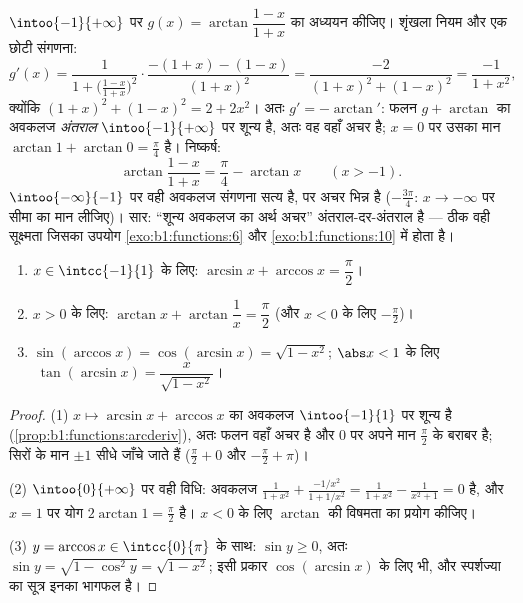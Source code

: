 \begin{example}\label{ex:b1:functions:hiddenconst}
$\intoo{-1} {+\infty}$ पर $g(x) = \arctan\dfrac{1 - x}{1 + x}$ का अध्ययन
कीजिए। शृंखला नियम और एक छोटी संगणना:
\[
g'(x) = \frac{1}{1 + \bigl(\frac{1-x}{1+x}\bigr)^2}\cdot
\frac{-(1+x) - (1-x)}{(1+x)^2}
= \frac{-2}{(1+x)^2 + (1-x)^2}
= \frac{-1}{1 + x^2} ,
\]
क्योंकि $(1+x)^2 + (1-x)^2 = 2 + 2x^2$। अतः $g' = -\arctan'$: फलन $g +
\arctan$ का अवकलज \emph{अंतराल} $\intoo{-1}{+\infty}$ पर शून्य है, अतः वह
वहाँ अचर है; $x = 0$ पर उसका मान $\arctan 1 + \arctan 0 = \frac\pi4$ है।
निष्कर्ष:
\[
\arctan\frac{1 - x}{1 + x} = \frac\pi4 - \arctan x
\qquad (x > -1) .
\]
$\intoo{-\infty}{-1}$ पर वही अवकलज संगणना सत्य है, पर अचर भिन्न है
($-\frac{3\pi}4$: $x \to -\infty$ पर सीमा का मान लीजिए)। सार: ``शून्य अवकलज
का अर्थ अचर'' अंतराल-दर-अंतराल  है --- ठीक वही सूक्ष्मता जिसका उपयोग
\cref{exo:b1:functions:6} और \cref{exo:b1:functions:10} में होता है।
\end{example}

\begin{proposition}[मानक सर्वसमिकाएँ]\label{prop:b1:functions:arcidentities}
\begin{enumerate}
  \item $x \in \intcc{-1}{1}$ के लिए: $\arcsin x + \arccos x =
  \dfrac{\pi}{2}$।
  \item $x > 0$ के लिए: $\arctan x + \arctan\dfrac 1x = \dfrac{\pi}{2}$ (और
  $x < 0$ के लिए $-\frac\pi2$)।
  \item $\sin(\arccos x) = \cos(\arcsin x) = \sqrt{1 - x^2}$; $\abs x < 1$
  के लिए $\;\tan(\arcsin x) = \dfrac{x}{\sqrt{1 - x^2}}$।
\end{enumerate}
\end{proposition}

\begin{proof}
(1) $x \mapsto \arcsin x + \arccos x$ का अवकलज $\intoo{-1}{1}$ पर शून्य है
(\cref{prop:b1:functions:arcderiv}), अतः फलन वहाँ अचर है और $0$ पर अपने मान
$\frac\pi2$ के बराबर है; सिरों के मान $\pm 1$ सीधे जाँचे जाते हैं
($\frac\pi2 + 0$ और $-\frac\pi2 + \pi$)।

(2) $\intoo{0}{+\infty}$ पर वही विधि: अवकलज $\frac{1}{1+x^2} +
\frac{-1/x^2}{1 + 1/x^2} = \frac{1}{1+x^2} - \frac{1}{x^2 + 1} = 0$ है, और
$x = 1$ पर योग $2\arctan 1 = \frac\pi2$ है। $x < 0$ के लिए $\arctan$ की
विषमता का प्रयोग कीजिए।

(3) $y = \arccos x \in \intcc{0}{\pi}$ के साथ: $\sin y \geq 0$, अतः $\sin y
= \sqrt{1 - \cos^2 y} = \sqrt{1 - x^2}$; इसी प्रकार $\cos(\arcsin x)$ के लिए
भी, और स्पर्शज्या का सूत्र इनका भागफल है।
\end{proof}

